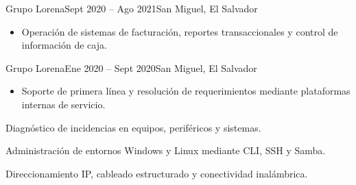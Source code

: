 \documentclass[10pt,a4paper,ragged2e]{Mark_IV_Plantilla}
\begin{document}
{Grupo Lorena}{Sept 2020 -- Ago 2021}{San Miguel, El Salvador}
\begin{itemize}
  \item Operación de sistemas de facturación, reportes transaccionales y
  control de información de caja.
\end{itemize}
\divider

{Grupo Lorena}{Ene 2020 -- Sept 2020}{San Miguel, El Salvador}
\begin{itemize}
  \item Soporte de primera línea y resolución de requerimientos mediante
  plataformas internas de servicio.
\end{itemize}


{Diagnóstico de incidencias en equipos, periféricos y sistemas.}

\divider

{Administración de entornos Windows y Linux mediante CLI, SSH y Samba.}

\divider

{Direccionamiento IP, cableado estructurado y conectividad inalámbrica.}
\end{document}
